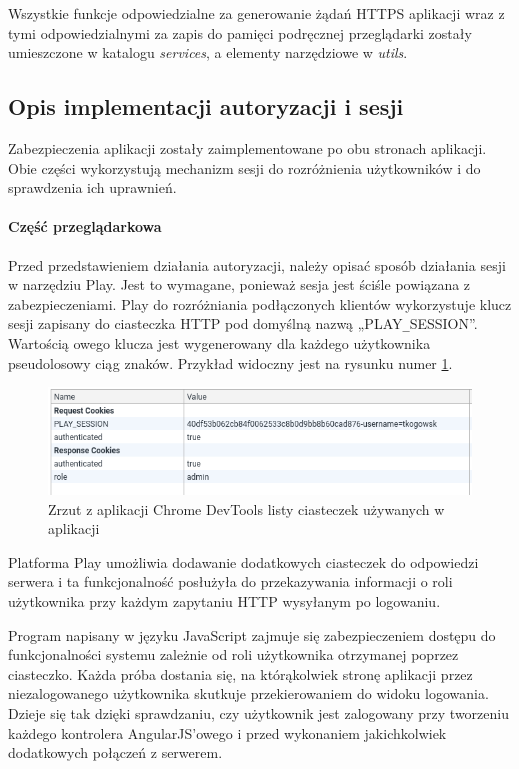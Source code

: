 \documentclass[a4paper,12pt,twoside]{article}
\begin{document}
Wszystkie funkcje odpowiedzialne za generowanie
żądań HTTPS aplikacji wraz z tymi odpowiedzialnymi
za zapis do pamięci podręcznej przeglądarki zostały umieszczone w
katalogu \textit{services}, a elementy narzędziowe w \textit{utils}.

\subsection{Opis implementacji autoryzacji i sesji}

Zabezpieczenia aplikacji zostały zaimplementowane po obu stronach aplikacji.
Obie części wykorzystują mechanizm sesji do rozróżnienia użytkowników
i do sprawdzenia ich uprawnień.

\paragraph{Część przeglądarkowa}
Przed przedstawieniem działania autoryzacji, należy opisać
sposób działania sesji w narzędziu Play. Jest to wymagane, ponieważ
sesja jest ściśle powiązana z zabezpieczeniami.
Play do rozróżniania podłączonych klientów wykorzystuje klucz sesji zapisany do
ciasteczka HTTP pod domyślną nazwą „PLAY\verb!_!SESSION”.
Wartością owego klucza jest wygenerowany dla każdego użytkownika pseudolosowy ciąg znaków. Przykład widoczny jest na rysunku numer \ref{fig:cookiespic}.

\begin{figure}[h]
\includegraphics[width=\linewidth]{obrazy/aplikacja/cookies.png}
\caption{Zrzut z aplikacji Chrome DevTools listy ciasteczek używanych w aplikacji}
\label{fig:cookiespic}
\end{figure}
\newpage

Platforma Play umożliwia dodawanie dodatkowych ciasteczek do odpowiedzi serwera
i ta funkcjonalność posłużyła do przekazywania informacji o roli użytkownika przy każdym zapytaniu HTTP wysyłanym po logowaniu.

Program napisany w języku JavaScript zajmuje się zabezpieczeniem
dostępu do funkcjonalności systemu zależnie od roli użytkownika otrzymanej
poprzez ciasteczko.
Każda próba dostania się, na którąkolwiek stronę aplikacji przez niezalogowanego użytkownika skutkuje przekierowaniem do widoku logowania.
Dzieje się tak dzięki sprawdzaniu, czy użytkownik jest zalogowany przy tworzeniu każdego kontrolera AngularJS'owego i przed
wykonaniem jakichkolwiek dodatkowych połączeń z serwerem.
\end{document}
